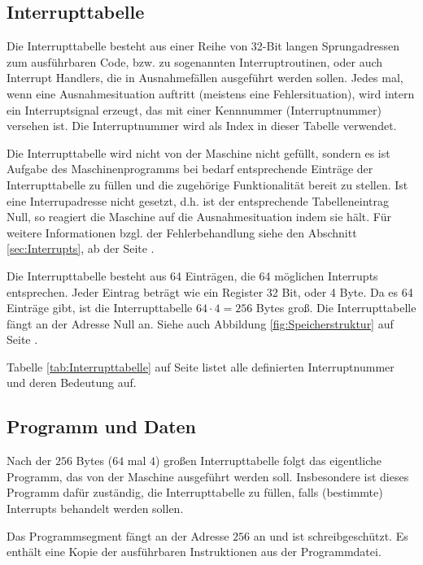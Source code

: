 \subsection{Interrupttabelle}
\label{subsubsec:Interrupttabelle}

Die Interrupttabelle besteht aus einer Reihe von 32-Bit langen Sprungadressen
zum ausführbaren Code, bzw. zu sogenannten Interruptroutinen, oder auch \glqq
Interrupt Handlers\grqq, die in Ausnahmefällen ausgeführt werden sollen. Jedes
mal, wenn eine Ausnahmesituation auftritt (meistens eine Fehlersituation), wird
intern ein Interruptsignal erzeugt, das mit einer Kennnummer (Interruptnummer)
versehen ist. Die Interruptnummer wird als Index in dieser Tabelle verwendet.


Die Interrupttabelle wird nicht von der Maschine nicht gefüllt, sondern es ist
Aufgabe des Maschinenprogramms bei bedarf entsprechende Einträge der
Interrupttabelle zu füllen und die zugehörige Funktionalität bereit zu stellen.
Ist eine Interrupadresse nicht gesetzt, d.h. ist der entsprechende
Tabelleneintrag Null, so reagiert die Maschine auf die Ausnahmesituation
indem sie hält. Für weitere Informationen bzgl. der Fehlerbehandlung siehe den
Abschnitt \ref{sec:Interrupts}, ab der Seite \pageref{sec:Interrupts}.

Die Interrupttabelle besteht aus 64 Einträgen, die 64 möglichen Interrupts
entsprechen. Jeder Eintrag beträgt wie ein Register 32 Bit, oder 4 Byte. Da es
64 Einträge gibt, ist die Interrupttabelle $64 \cdot 4 = 256$ Bytes groß. Die
Interrupttabelle fängt an der Adresse Null an. Siehe auch Abbildung
\ref{fig:Speicherstruktur} auf Seite \pageref{fig:Speicherstruktur}.


Tabelle \ref{tab:Interrupttabelle} auf Seite
\pageref{tab:Interrupttabelle} listet alle definierten
Interruptnummer und deren Bedeutung auf.


\subsection{Programm und Daten}
\label{subsec:Prog-Daten}

Nach der $256$ Bytes ($64$ mal $4$) großen Interrupttabelle
folgt das eigentliche Programm, das von der Maschine ausgeführt werden soll.
Insbesondere ist dieses Programm dafür zuständig, die Interrupttabelle zu
füllen, falls (bestimmte) Interrupts behandelt werden sollen.


Das Programmsegment fängt an der Adresse $256$ an und ist
schreibgeschützt. Es enthält eine Kopie der ausführbaren Instruktionen aus
der Programmdatei.

